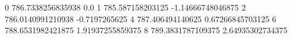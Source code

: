 0 786.7338256835938 0.0
1 785.587158203125 -1.14666748046875
2 786.0140991210938 -0.7197265625
4 787.406494140625 0.67266845703125
6 788.6531982421875 1.91937255859375
8 789.3831787109375 2.64935302734375

